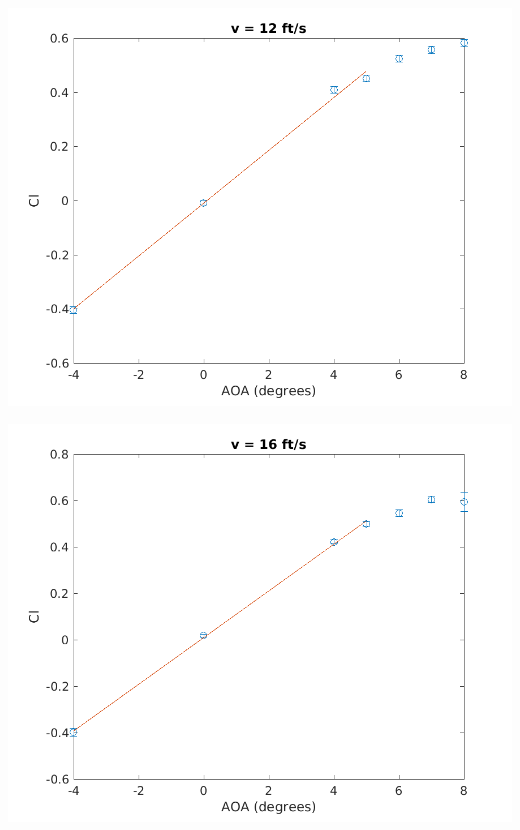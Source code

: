 \documentclass{article}
\begin{document}
\begin{minipage}{0.5\linewidth}
	\centering
	\includegraphics[width = \textwidth]{12plot.png}
\end{minipage}
\begin{minipage}{0.5\linewidth}
	\centering
	\includegraphics[width = \textwidth]{16plot.png}
\end{minipage}
\end{document}
